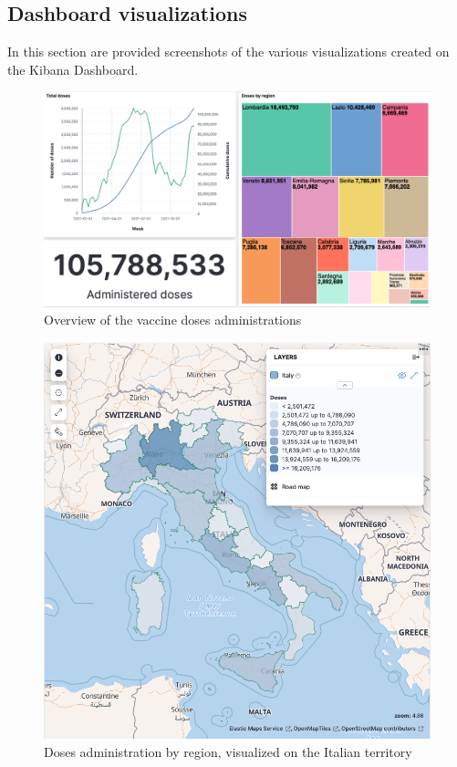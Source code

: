 \documentclass{article}
\begin{document}
\subsection{Dashboard visualizations}
In this section are provided screenshots of the various visualizations created on the Kibana Dashboard.
    \begin{figure}
        \centering
        \includegraphics[scale=0.3]{ir databases/screenshots/adm_overview.png}
        \caption{Overview of the vaccine doses administrations}
        \label{fig:adm_overview}
    \end{figure}
    \begin{figure}
        \centering
        \includegraphics[scale=0.3]{ir databases/screenshots/map.png}
        \caption{Doses administration by region, visualized on the Italian territory}
        \label{fig:map}
    \end{figure}
\end{document}
